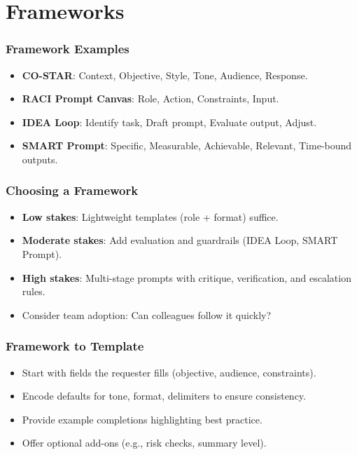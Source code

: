 \documentclass{beamer}
\begin{document}
\section{Frameworks}

\begin{frame}
    \frametitle{Framework Examples}
    \begin{itemize}
        \item \textbf{CO-STAR}: Context, Objective, Style, Tone, Audience, Response.
        \item \textbf{RACI Prompt Canvas}: Role, Action, Constraints, Input.
        \item \textbf{IDEA Loop}: Identify task, Draft prompt, Evaluate output, Adjust.
        \item \textbf{SMART Prompt}: Specific, Measurable, Achievable, Relevant, Time-bound outputs.
    \end{itemize}
\end{frame}

\begin{frame}
    \frametitle{Choosing a Framework}
    \begin{itemize}
        \item \textbf{Low stakes}: Lightweight templates (role + format) suffice.
        \item \textbf{Moderate stakes}: Add evaluation and guardrails (IDEA Loop, SMART Prompt).
        \item \textbf{High stakes}: Multi-stage prompts with critique, verification, and escalation rules.
        \item Consider team adoption: Can colleagues follow it quickly?
    \end{itemize}
\end{frame}

\begin{frame}
    \frametitle{Framework to Template}
    \begin{itemize}
        \item Start with fields the requester fills (objective, audience, constraints).
        \item Encode defaults for tone, format, delimiters to ensure consistency.
        \item Provide example completions highlighting best practice.
        \item Offer optional add-ons (e.g., risk checks, summary level).
    \end{itemize}
\end{frame}
\end{document}

